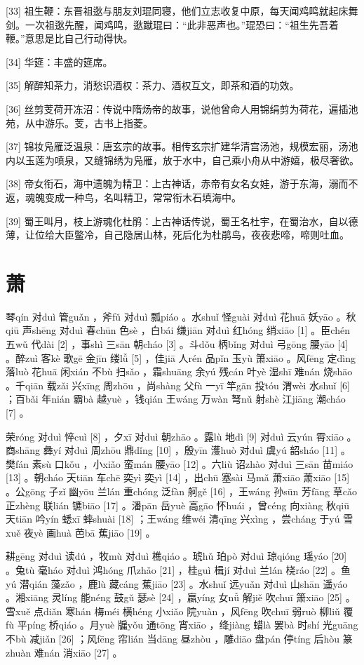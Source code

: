 \documentclass[12pt,UTF8]{ctexbook}
\begin{document}
[33] 祖生鞭：东晋祖逖与朋友刘琨同寝，他们立志收复中原，每天闻鸡鸣就起床舞剑。一次祖逖先醒，闻鸡鸣，逖蹴琨曰：“此非恶声也。”琨恐曰：“祖生先吾着鞭。”意思是比自己行动得快。

[34] 华筵：丰盛的筵席。

[35] 解醉知茶力，消愁识酒权：茶力、酒权互文，即茶和酒的功效。

[36] 丝剪芰荷开冻沼：传说中隋炀帝的故事，说他曾命人用锦绢剪为荷花，遍插池苑，从中游乐。芰，古书上指菱。

[37] 锦妆凫雁泛温泉：唐玄宗的故事。相传玄宗扩建华清宫汤池，规模宏丽，汤池内以玉莲为喷泉，又缝锦绣为凫雁，放于水中，自己乘小舟从中游嬉，极尽奢欲。

[38] 帝女衔石，海中遗魄为精卫：上古神话，赤帝有女名女娃，游于东海，溺而不返，魂魄变成一种鸟，名叫精卫，常常衔木石填海中。

[39] 蜀王叫月，枝上游魂化杜鹃：上古神话传说，蜀王名杜宇，在蜀治水，自以德薄，让位给大臣鳖冷，自己隐居山林，死后化为杜鹃鸟，夜夜悲啼，啼则吐血。





\chapter{萧}


琴qín 对duì 管guǎn ，斧fǔ 对duì 瓢piáo 。水shuǐ 怪guài 对duì 花huā 妖yāo 。秋qiū 声shēng 对duì 春chūn 色sè ，白bái 缣jiān 对duì 红hóng 绡xiāo [1] 。臣chén 五wǔ 代dài [2] ，事shì 三sān 朝cháo [3] 。斗dǒu 柄bǐng 对duì 弓gōng 腰yāo [4] 。醉zuì 客kè 歌gē 金jīn 缕lǚ [5] ，佳jiā 人rén 品pǐn 玉yù 箫xiāo 。风fēng 定dìng 落luò 花huā 闲xián 不bù 扫sǎo ，霜shuāng 余yú 残cán 叶yè 湿shī 难nán 烧shāo 。千qiān 载zǎi 兴xīng 周zhōu ，尚shàng 父fù 一yī 竿gān 投tóu 渭wèi 水shuǐ [6] ；百bǎi 年nián 霸bà 越yuè ，钱qián 王wáng 万wàn 弩nǔ 射shè 江jiāng 潮cháo [7] 。

荣róng 对duì 悴cuì [8] ，夕xī 对duì 朝zhāo 。露lù 地dì [9] 对duì 云yún 霄xiāo 。商shāng 彝yí 对duì 周zhōu 鼎dǐng [10] ，殷yīn 濩huò 对duì 虞yú 韶sháo [11] 。樊fán 素sù 口kǒu ，小xiǎo 蛮mán 腰yāo [12] 。六liù 诏zhào 对duì 三sān 苗miáo [13] 。朝cháo 天tiān 车chē 奕yì 奕yì [14] ，出chū 塞sài 马mǎ 萧xiāo 萧xiāo [15] 。公gōng 子zǐ 幽yōu 兰lán 重chóng 泛fàn 舸gě [16] ，王wáng 孙sūn 芳fāng 草cǎo 正zhèng 联lián 镳biāo [17] 。潘pān 岳yuè 高gāo 怀huái ，曾céng 向xiàng 秋qiū 天tiān 吟yín 蟋xī 蟀shuài [18] ；王wáng 维wéi 清qīng 兴xìng ，尝cháng 于yú 雪xuě 夜yè 画huà 芭bā 蕉jiāo [19] 。

耕gēng 对duì 读dú ，牧mù 对duì 樵qiáo 。琥hǔ 珀pò 对duì 琼qióng 瑶yáo [20] 。兔tù 毫háo 对duì 鸿hóng 爪zhǎo [21] ，桂guì 楫jí 对duì 兰lán 桡ráo [22] 。鱼yú 潜qián 藻zǎo ，鹿lù 藏cáng 蕉jiāo [23] 。水shuǐ 远yuǎn 对duì 山shān 遥yáo 。湘xiāng 灵líng 能néng 鼓gǔ 瑟sè [24] ，嬴yíng 女nǚ 解jiě 吹chuī 箫xiāo [25] 。雪xuě 点diǎn 寒hán 梅méi 横héng 小xiǎo 院yuàn ，风fēng 吹chuī 弱ruò 柳liǔ 覆fù 平píng 桥qiáo 。月yuè 牖yǒu 通tōng 宵xiāo ，绛jiàng 蜡là 罢bà 时shí 光guāng 不bù 减jiǎn [26] ；风fēng 帘lián 当dāng 昼zhòu ，雕diāo 盘pán 停tíng 后hòu 篆zhuàn 难nán 消xiāo [27] 。
\end{document}
